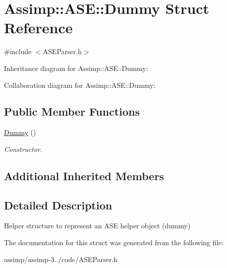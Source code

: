 \hypertarget{struct_assimp_1_1_a_s_e_1_1_dummy}{\section{Assimp\+:\+:A\+S\+E\+:\+:Dummy Struct Reference}
\label{struct_assimp_1_1_a_s_e_1_1_dummy}
}


{\ttfamily \#include $<$A\+S\+E\+Parser.\+h$>$}



Inheritance diagram for Assimp\+:\+:A\+S\+E\+:\+:Dummy\+:


Collaboration diagram for Assimp\+:\+:A\+S\+E\+:\+:Dummy\+:
\subsection*{Public Member Functions}
\begin{DoxyCompactItemize}
\item 
\hypertarget{struct_assimp_1_1_a_s_e_1_1_dummy_ab58eb463bde0e07f341f8c1dff30f5f7}{\hyperlink{struct_assimp_1_1_a_s_e_1_1_dummy_ab58eb463bde0e07f341f8c1dff30f5f7}{Dummy} ()}\label{struct_assimp_1_1_a_s_e_1_1_dummy_ab58eb463bde0e07f341f8c1dff30f5f7}

\begin{DoxyCompactList}\small\item\em Constructor. \end{DoxyCompactList}\end{DoxyCompactItemize}
\subsection*{Additional Inherited Members}


\subsection{Detailed Description}
Helper structure to represent an A\+S\+E helper object (dummy) 

The documentation for this struct was generated from the following file\+:\begin{DoxyCompactItemize}
\item 
assimp/assimp-\/3../code/A\+S\+E\+Parser.\+h\end{DoxyCompactItemize}
